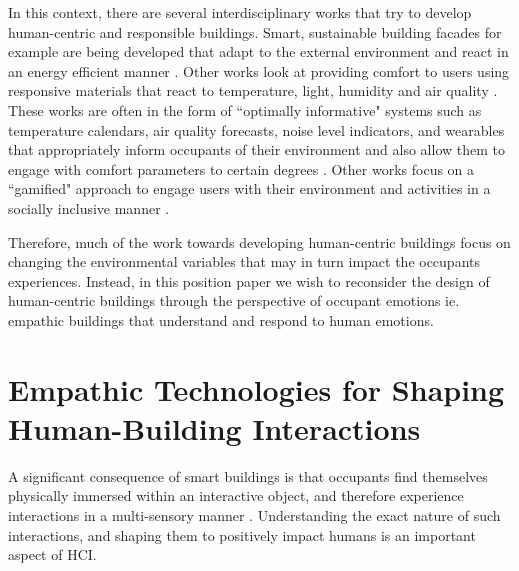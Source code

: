 \documentclass[manuscript, anonymous, review]{acmart}
\begin{document}
In this context, there are several interdisciplinary works that try to develop human-centric and responsible buildings. Smart, sustainable building facades for example are being developed that adapt to the external environment and react in an energy efficient manner \cite{ahmed2015development}. Other works look at providing comfort to users using responsive materials that react to temperature, light, humidity and air quality \cite{fragkia2020exergy, holstov2015hygromorphic}. These works are often in the form of ``optimally informative" systems such as temperature calendars, air quality forecasts, noise level indicators, and wearables that appropriately inform occupants of their environment and also allow them to engage with comfort parameters to certain degrees  \cite{costanza2016bit, kim2020designing}. Other works focus on a ``gamified" approach to engage users with their environment and activities in a socially inclusive manner \cite{mathur2015tiny, zhong2022augmenting}. 

Therefore, much of the work towards developing human-centric buildings focus on changing the environmental variables that may in turn impact the occupants experiences. Instead, in this position paper we wish to reconsider the design of human-centric buildings through the perspective of occupant emotions ie. empathic buildings that understand and respond to human emotions.





\section{Empathic Technologies for Shaping Human-Building Interactions}

A significant consequence of smart buildings is that occupants find themselves physically immersed within an interactive object, and therefore experience interactions in a multi-sensory manner \cite{nembrini2017human}. Understanding the exact nature of such interactions, and shaping them to positively impact humans is an important aspect of HCI.   
\end{document}
